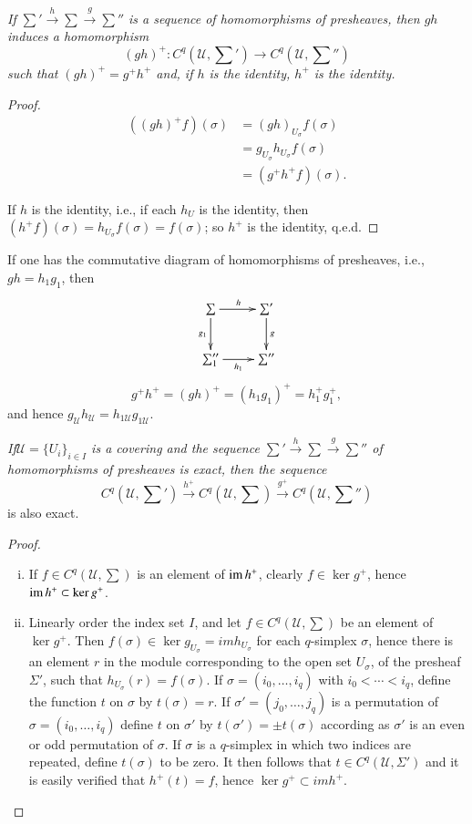 \textit{If $\sum' \xrightarrow{h} \sum \xrightarrow{g} \sum''$ is
  a  sequence of homomorphisms of presheaves, then $g h$ induces a
  homomorphism 
$$
(gh)^+ : C^q (\mathscr{U}, \sum') \to C^q (\mathscr{U}, \sum'') 
$$
such that $(gh)^+ = g^+ h^+$ and, if $h$ is the identity, $h^+$ is the
identity.} 

\begin{proof}%
\begin{align*}
((gh)^+ f) (\sigma) & = (gh)_{U_\sigma} f(\sigma)\\
& = g_{U_\sigma} h_{U_\sigma} f(\sigma)\\
& = (g^+ h^+ f) (\sigma).
\end{align*}

If $h$ is the identity, i.e., if each $h_U$ is the identity, then
$(h^+ f) (\sigma) = h_{U_\sigma} f(\sigma) = f(\sigma)$; so $h^+$ is
the identity, q.e.d. 
\end{proof}

If one has the commutative diagram of homomorphisms of preshea\-ves,
i.e., $g h = h_1 g_1$, then 
\[
\xymatrix{
\sum \ar[r]^{h} \ar[d]_{g_1} & \sum'\ar[d]^g\\
\sum''_1 \ar[r]_{h_1} & \sum''
}
\]
$$
 g^+ h^+ = (gh)^+ = (h_1 g_1)^+ = h^+_1 g^+_1, 
$$ 
and hence $g_{\mathscr{U}} h_{\mathscr{U}} = h_{1 \mathscr{U}}
g_{1 \mathscr{U}}$. 

\textit{If\pageoriginale $\mathscr{U} =\{U_i\}_{i \in I}$ is a covering and the 
  sequence $\sum' \xrightarrow{h} \sum \xrightarrow{g} \sum''$ of
  homomorphisms of presheaves is exact, then the sequence}  
$$
C^q (\mathscr{U}, \sum') \xrightarrow{h^+} C^q (\mathscr{U}, \sum)
\xrightarrow{g^+} C^q (\mathscr{U}, \sum'') 
$$
is also exact.

\begin{proof}%
\begin{enumerate}[(i)]
\item If $f \in C^q (\mathscr{U}, \sum)$ is an element of $\operatorname{im} h^+$,
  clearly $f \in \ker g^+$, hence $\operatorname{im} h^+ \subset \ker g^+$. 

\item Linearly order the index set $I$, and let $f \in C^q
  (\mathscr{U}, \sum)$ be an element of $\ker g^+$. Then $f(\sigma)
  \in \ker g_{U_\sigma} = im h_{U_\sigma}$ for each $q$-simplex
  $\sigma$, hence there is an element $r$ in the module corresponding
  to the open set $U_\sigma$, of the presheaf $\Sigma'$, such that
  $h_{U_\sigma} (r) = f(\sigma)$. If $\sigma = (i_0, \ldots , i_q)$
  with $i_0 < \cdots < i_q$, define the function $t$ on $\sigma$ by
  $t(\sigma) = r$. If $\sigma' = (j_0, \ldots , j_q)$ is a permutation
  of $\sigma = (i_0 , \ldots,  i_q)$ define $t$ on $\sigma '$ by
  $t(\sigma ') = \pm t(\sigma)$ 
  according as $\sigma '$ is an even or odd permutation of
  $\sigma$. If $\sigma$ is a $q$-simplex in which two indices are
  repeated, define $t(\sigma)$ to be zero. It then follows that $t \in
  C^q (\mathscr{U}, \Sigma')$ and it is easily verified that $h^+(t) =
  f$, hence $\ker g^+ \subset im h^+$. 
\end{enumerate}
\end{proof}


